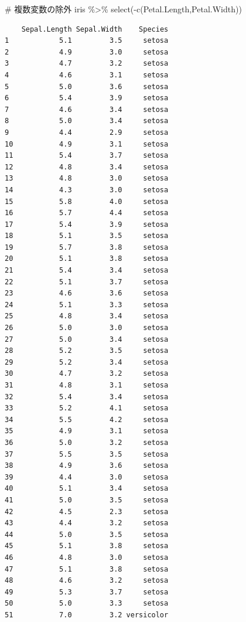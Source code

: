 \documentclass[
  a4paper,
]{ltjsbook}
\newenvironment{Shaded}{\begin{snugshade}}{\end{snugshade}}
\newcommand{\CommentTok}[1]{\textcolor[rgb]{0.37,0.37,0.37}{#1}}
\newcommand{\FunctionTok}[1]{\textcolor[rgb]{0.28,0.35,0.67}{#1}}
\newcommand{\NormalTok}[1]{\textcolor[rgb]{0.00,0.23,0.31}{#1}}
\newcommand{\SpecialCharTok}[1]{\textcolor[rgb]{0.37,0.37,0.37}{#1}}
\begin{document}
\begin{Shaded}
\begin{Highlighting}[]
\CommentTok{\# 複数変数の除外}
\NormalTok{iris }\SpecialCharTok{\%\textgreater{}\%} \FunctionTok{select}\NormalTok{(}\SpecialCharTok{{-}}\FunctionTok{c}\NormalTok{(Petal.Length,Petal.Width))}
\end{Highlighting}
\end{Shaded}

\begin{verbatim}
    Sepal.Length Sepal.Width    Species
1            5.1         3.5     setosa
2            4.9         3.0     setosa
3            4.7         3.2     setosa
4            4.6         3.1     setosa
5            5.0         3.6     setosa
6            5.4         3.9     setosa
7            4.6         3.4     setosa
8            5.0         3.4     setosa
9            4.4         2.9     setosa
10           4.9         3.1     setosa
11           5.4         3.7     setosa
12           4.8         3.4     setosa
13           4.8         3.0     setosa
14           4.3         3.0     setosa
15           5.8         4.0     setosa
16           5.7         4.4     setosa
17           5.4         3.9     setosa
18           5.1         3.5     setosa
19           5.7         3.8     setosa
20           5.1         3.8     setosa
21           5.4         3.4     setosa
22           5.1         3.7     setosa
23           4.6         3.6     setosa
24           5.1         3.3     setosa
25           4.8         3.4     setosa
26           5.0         3.0     setosa
27           5.0         3.4     setosa
28           5.2         3.5     setosa
29           5.2         3.4     setosa
30           4.7         3.2     setosa
31           4.8         3.1     setosa
32           5.4         3.4     setosa
33           5.2         4.1     setosa
34           5.5         4.2     setosa
35           4.9         3.1     setosa
36           5.0         3.2     setosa
37           5.5         3.5     setosa
38           4.9         3.6     setosa
39           4.4         3.0     setosa
40           5.1         3.4     setosa
41           5.0         3.5     setosa
42           4.5         2.3     setosa
43           4.4         3.2     setosa
44           5.0         3.5     setosa
45           5.1         3.8     setosa
46           4.8         3.0     setosa
47           5.1         3.8     setosa
48           4.6         3.2     setosa
49           5.3         3.7     setosa
50           5.0         3.3     setosa
51           7.0         3.2 versicolor

\end{verbatim}
\end{document}

